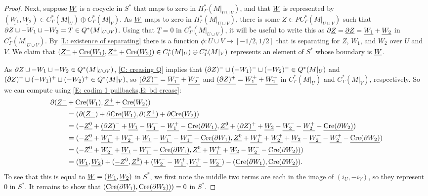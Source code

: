 \begin{proof}
	Next, suppose $\underline{W}$ is a cocycle in $S^*$ that maps to zero in $H_{\Gamma}^*(M|_{U \cup V})$, and that $\underline{W}$ is represented by $(\underline{W_1},\underline{W_2}) \in C^*_\Gamma(M|_U) \oplus C^*_\Gamma(M|_V)$.
	As $\underline{W}$ maps to zero in $H_{\Gamma}^*(M|_{U \cup V})$, there is some $Z \in PC^*_\Gamma(M|_{U \cup V})$ such that $\partial Z \sqcup - W_1 \sqcup -W_2 = T \in Q^*(M|_{U \cup V})$.
	Using that $\underline T = 0$ in $C^*_\Gamma(M|_{U \cup V})$, it will be useful to write this as $\partial \underline{Z} = \underline{\partial Z} = \underline{W_1} + \underline {W_2}$ in $C^*_\Gamma(M|_{U \cup V})$.
	By \cref{L: existence of separating} there is a function $\phi \colon U \cup V \to [-1/2,1/2]$ that is separating for $Z$, $W_1$, and $W_2$ over $U$ and $V$.
  	We claim that $(\underline{Z^-}+\underline{\mathrm{Cre}(W_1)},\underline{Z^+}+\underline{\mathrm{Cre}(W_2)}) \in C^*_\Gamma(M|_U) \oplus C^*_\Gamma(M|_V)$ represents an element of $S^*$ whose boundary is $\underline{W}$.


	As $\partial Z \sqcup - W_1 \sqcup -W_2 \in Q^*(M|_{U \cup V})$, \cref{C: creasing Q} implies that $(\partial Z)^- \sqcup (- W_1)^- \sqcup (-W_2)^- \in Q^*(M|_U)$ and $(\partial Z)^+ \sqcup (- W_1)^+ \sqcup (-W_2)^+ \in Q^*(M|_V)$, so $\underline{(\partial Z)^- }= \underline{W_1^-} + \underline{W_2^-}$ and $\underline{(\partial Z)^+} = \underline{W_1^+} + \underline{W_2^+}$ in $C^*_\Gamma(M|_U)$ and $C^*_\Gamma(M|_V)$, respectively.
	So we can compute using \cref{E: codim 1 pullbacks,E: bd crease}:
	\begin{align*}
		\partial (\underline{Z^-}&+\underline{\mathrm{Cre}(W_1)},\underline{Z^+}+\underline{\mathrm{Cre}(W_2)})\\
		&= (\partial (\underline{Z^-})+\partial \underline{\mathrm{Cre}(W_1)},\partial (\underline{Z^+})+\partial\underline{\mathrm{Cre}(W_2)})\\
		& = (-\underline{Z^0} + \underline{(\partial Z)^-}+\underline{W_1} -\underline{W_1^-} - \underline{W_1^+} -\underline{\mathrm{Cre}(\partial W_1)},\underline{Z^0} + \underline{(\partial Z)^+} +\underline{W_2} -\underline{W_2^-} -\underline{W_2^+} -\underline{\mathrm{Cre}(\partial W_2)})\\
		& = (-\underline{Z^0} + \underline{W_1^-} + \underline{W_2^-} +\underline{W_1} -\underline{W_1^-} -\underline{W_1^+} -\underline{\mathrm{Cre}(\partial W_1)},\underline{Z^0}+ \underline{W_1^+}+ \underline{W_2^+} +\underline{W_2} -\underline{W_2^-} -\underline{W_2^+} -\underline{\mathrm{Cre}(\partial W_2)})\\
		& = (-\underline{Z^0} + \underline{W_2^-} + \underline{W_1} -\underline{W_1^+} -\underline{\mathrm{Cre}(\partial W_1)},\underline{Z^0}+ \underline{W_1^+} + \underline{W_2} -\underline{W_2^-} -\underline{\mathrm{Cre}(\partial W_2))})\\
		& = (\underline{W_1},\underline{W_2})+ (\underline{-Z^0},\underline{Z^0}) + (\underline{W_2^-}-\underline{W_1^+}, \underline{W_1^+} -\underline{W_2^-}) -(\underline{\mathrm{Cre}(\partial W_1)},\underline{\mathrm{Cre}(\partial W_2)}).
	\end{align*}
	To see that this is equal to $\underline{W} = (\underline{W_1},\underline{W_2})$ in $S^*$, we first note the middle two terms are each in the image of $(i_U, -i_V)$, so they represent $0$ in $S^*$.
	It remains to show that $(\underline{\mathrm{Cre}(\partial W_1)},\underline{\mathrm{Cre}(\partial W_2))})=0$ in $S^*$.


\end{proof}
